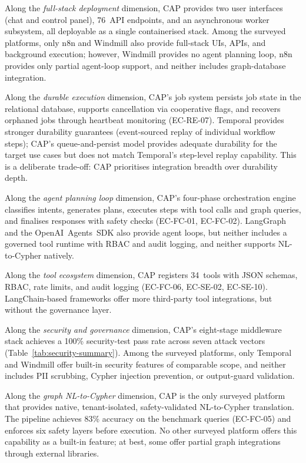 \documentclass[a4paper,noexaminfo]{sapthesis}
\begin{document}
Along the \emph{full-stack deployment} dimension, CAP provides two user
interfaces (chat and control panel), 76~API endpoints, and an
asynchronous worker subsystem, all deployable as a single containerised
stack.  Among the surveyed platforms, only n8n and Windmill also provide
full-stack UIs, APIs, and background execution; however, Windmill
provides no agent planning loop, n8n provides only partial agent-loop
support, and neither includes graph-database integration.

Along the \emph{durable execution} dimension, CAP's job system persists
job state in the relational database, supports cancellation via
cooperative flags, and recovers orphaned jobs through heartbeat
monitoring (EC-RE-07).  Temporal provides stronger durability guarantees
(event-sourced replay of individual workflow steps); CAP's queue-and-persist
model provides adequate durability for the target use cases but does not
match Temporal's step-level replay capability.  This is a deliberate
trade-off: CAP prioritises integration breadth over durability depth.

Along the \emph{agent planning loop} dimension, CAP's four-phase
orchestration engine classifies intents, generates plans, executes steps
with tool calls and graph queries, and finalises responses with safety
checks (EC-FC-01, EC-FC-02).  LangGraph and the OpenAI~Agents~SDK also
provide agent loops, but neither includes a governed tool runtime with
RBAC and audit logging, and neither supports NL-to-Cypher natively.

Along the \emph{tool ecosystem} dimension, CAP registers 34~tools with
JSON schemas, RBAC, rate limits, and audit logging (EC-FC-06, EC-SE-02,
EC-SE-10).  LangChain-based frameworks offer more third-party tool
integrations, but without the governance layer.

Along the \emph{security and governance} dimension, CAP's eight-stage
middleware stack achieves a 100\% security-test pass rate across seven
attack vectors (Table~\ref{tab:security-summary}).  Among the surveyed
platforms, only Temporal and Windmill offer built-in security features
of comparable scope, and neither includes PII scrubbing, Cypher injection
prevention, or output-guard validation.

Along the \emph{graph NL-to-Cypher} dimension, CAP is the only surveyed
platform that provides native, tenant-isolated, safety-validated
NL-to-Cypher translation.  The pipeline achieves 83\% accuracy on
the benchmark queries (EC-FC-05) and enforces six safety layers before
execution.  No other surveyed platform offers this capability as a
built-in feature; at best, some offer partial graph integrations through
external libraries.
\end{document}
